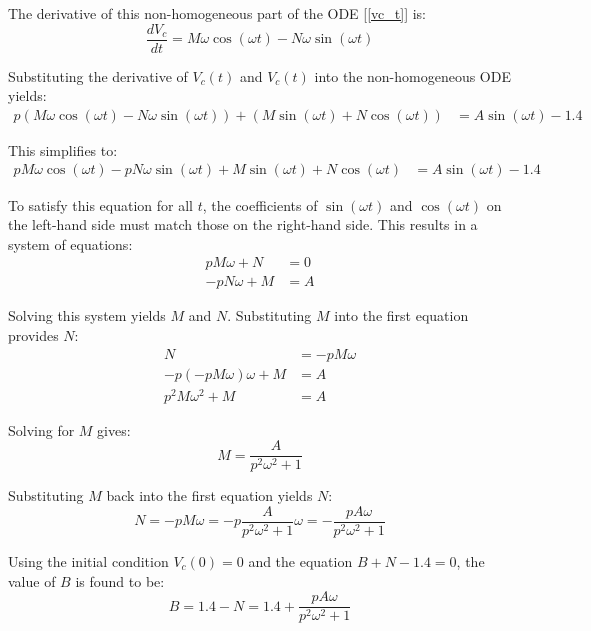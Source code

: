 The derivative of this non-homogeneous part of the ODE [\ref{vc_t}] is:
\begin{equation}
\frac{dV_c}{dt} = M\omega\cos(\omega t) - N\omega\sin(\omega t)
\end{equation}

Substituting the derivative of $V_c(t)$ and $V_c(t)$ into the non-homogeneous ODE yields:
\begin{align}
p(M\omega\cos(\omega t) - N\omega\sin(\omega t)) + (M\sin(\omega t) + N\cos(\omega t)) &= A\sin(\omega t) - 1.4
\end{align}

This simplifies to:
\begin{align}
pM\omega\cos(\omega t) - pN\omega\sin(\omega t) + M\sin(\omega t) + N\cos(\omega t) &= A\sin(\omega t) - 1.4
\end{align}

To satisfy this equation for all $t$, the coefficients of $\sin(\omega t)$ and $\cos(\omega t)$ on the left-hand side must match those on the right-hand side. This results in a system of equations:
\begin{align}
pM\omega + N &= 0\\
-pN\omega + M &= A
\end{align}

Solving this system yields $M$ and $N$. Substituting $M$ into the first equation provides $N$:
\begin{align}
N &= -pM\omega\\
-p(-pM\omega)\omega + M &= A\\
p^2M\omega^2 + M &= A
\end{align}

Solving for $M$ gives:
\begin{equation}
M = \frac{A}{p^2\omega^2 + 1}
\end{equation}

Substituting $M$ back into the first equation yields $N$:
\begin{equation}
N = -pM\omega = -p\frac{A}{p^2\omega^2 + 1}\omega = -\frac{pA\omega}{p^2\omega^2 + 1}
\end{equation}

Using the initial condition $V_c(0) = 0$ and the equation $B + N - 1.4 = 0$, the value of $B$ is found to be:
\begin{equation}
B = 1.4 - N = 1.4 + \frac{pA\omega}{p^2\omega^2 + 1}
\end{equation}

